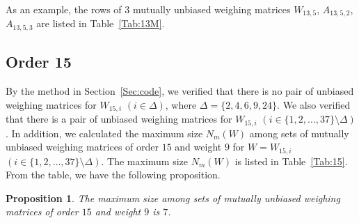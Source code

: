 \documentclass[12pt]{article}
\newtheorem{prop}[thm]{Proposition}
\theoremstyle{remark}
\begin{document}
As an example,
the rows of $3$ mutually unbiased weighing matrices $W_{13,5}$, $A_{13,5,2}$, $A_{13,5,3}$ are listed 
in Table~\ref{Tab:13M}.



\subsection{Order 15}


By the method in Section~\ref{Sec:code}, we verified that
there is no pair of unbiased weighing matrices for $W_{15,i}$
$(i \in \Delta)$, where $\Delta=\{2,4,6,9,24\}$.
We also verified that there is a pair of unbiased weighing matrices for $W_{15,i}$ 
$(i \in \{1,2,\ldots,37\}\setminus \Delta)$.
In addition, we calculated the maximum size $N_m(W)$ among sets of mutually
unbiased weighing matrices of order $15$ and weight $9$ for $W=W_{15,i}$ 
$(i \in \{1,2,\ldots,37\}\setminus \Delta)$.
The maximum size $N_m(W)$ is listed in Table~\ref{Tab:15}.
From the table, we have the following proposition.

\begin{prop}\label{prop:15-2}
The maximum size among sets of mutually
unbiased weighing matrices of order $15$ and weight $9$ is $7$.
\end{prop}
\end{document}

